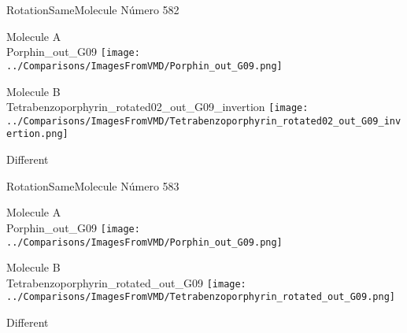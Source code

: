 \vtab[-3cm]
\begin{center}
{\large RotationSameMolecule \tab Número 582}
\end{center}
\begin{multicols}{2}
\begin{center}
Molecule A \\ 
Porphin\_out\_G09
\texttt{[image: ../Comparisons/ImagesFromVMD/Porphin\_out\_G09.png]}
\\
\vtab

\columnbreak
Molecule B \\ 
Tetrabenzoporphyrin\_rotated02\_out\_G09\_invertion
\texttt{[image: ../Comparisons/ImagesFromVMD/Tetrabenzoporphyrin\_rotated02\_out\_G09\_invertion.png]}
\\
\vtab


\end{center}
\end{multicols}
\begin{center}
\textcolor{NavyBlue}{\Large Different}
\end{center}

 \newpage

\vtab[-3cm]
\begin{center}
{\large RotationSameMolecule \tab Número 583}
\end{center}
\begin{multicols}{2}
\begin{center}
Molecule A \\ 
Porphin\_out\_G09
\texttt{[image: ../Comparisons/ImagesFromVMD/Porphin\_out\_G09.png]}
\\
\vtab

\columnbreak
Molecule B \\ 
Tetrabenzoporphyrin\_rotated\_out\_G09
\texttt{[image: ../Comparisons/ImagesFromVMD/Tetrabenzoporphyrin\_rotated\_out\_G09.png]}
\\
\vtab


\end{center}
\end{multicols}
\begin{center}
\textcolor{NavyBlue}{\Large Different}
\end{center}

 \newpage

